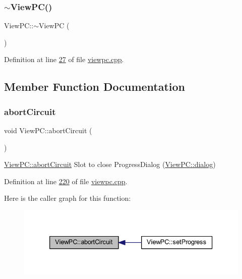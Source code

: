 \subsubsection{\texorpdfstring{$\sim$\+View\+P\+C()}{~ViewPC()}}
{\footnotesize\ttfamily View\+P\+C\+::$\sim$\+View\+PC (\begin{DoxyParamCaption}{ }\end{DoxyParamCaption})}



Definition at line \mbox{\hyperlink{viewpc_8cpp_source_l00027}{27}} of file \mbox{\hyperlink{viewpc_8cpp_source}{viewpc.\+cpp}}.



\subsection{Member Function Documentation}
\mbox{\label{class_view_p_c_ad7ba2fcf1d17862de15e32432823f7b0}} 
\subsubsection{\texorpdfstring{abort\+Circuit}{abortCircuit}}
{\footnotesize\ttfamily void View\+P\+C\+::abort\+Circuit (\begin{DoxyParamCaption}{ }\end{DoxyParamCaption})\hspace{0.3cm}{\ttfamily [slot]}}



\mbox{\hyperlink{class_view_p_c_ad7ba2fcf1d17862de15e32432823f7b0}{View\+P\+C\+::abort\+Circuit}} Slot to close Progress\+Dialog (\mbox{\hyperlink{class_view_p_c_a31abbb470fe329b44e6ffee202b903ca}{View\+P\+C\+::dialog}}) 



Definition at line \mbox{\hyperlink{viewpc_8cpp_source_l00220}{220}} of file \mbox{\hyperlink{viewpc_8cpp_source}{viewpc.\+cpp}}.

Here is the caller graph for this function\+:
\nopagebreak
\begin{figure}[H]
\begin{center}
\leavevmode
\includegraphics[width=333pt]{class_view_p_c_ad7ba2fcf1d17862de15e32432823f7b0_icgraph}
\end{center}
\end{figure}
\mbox{\label{class_view_p_c_a863f5233af3791bd165a2811a5d9bcc2}} 

